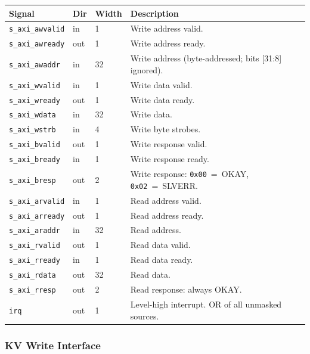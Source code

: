 \documentclass[10pt, a4paper]{article}
\newcommand{\hex}[1]{\texttt{0x#1}}
\newcommand{\portname}[1]{\texttt{#1}}
\begin{document}
\begin{tabularx}{\linewidth}{L{3.6cm} C{1.2cm} C{1.4cm} X}
\toprule
\textbf{Signal} & \textbf{Dir} & \textbf{Width} & \textbf{Description} \\
\midrule
{}
\portname{s\_axi\_awvalid} & in  & 1  & Write address valid. \\
\portname{s\_axi\_awready} & out & 1  & Write address ready. \\
\portname{s\_axi\_awaddr}  & in  & 32 & Write address (byte-addressed; bits [31:8] ignored). \\
\portname{s\_axi\_wvalid}  & in  & 1  & Write data valid. \\
\portname{s\_axi\_wready}  & out & 1  & Write data ready. \\
\portname{s\_axi\_wdata}   & in  & 32 & Write data. \\
\portname{s\_axi\_wstrb}   & in  & 4  & Write byte strobes. \\
\portname{s\_axi\_bvalid}  & out & 1  & Write response valid. \\
\portname{s\_axi\_bready}  & in  & 1  & Write response ready. \\
\portname{s\_axi\_bresp}   & out & 2  & Write response: \hex{00}~=~OKAY, \hex{02}~=~SLVERR. \\
\portname{s\_axi\_arvalid} & in  & 1  & Read address valid. \\
\portname{s\_axi\_arready} & out & 1  & Read address ready. \\
\portname{s\_axi\_araddr}  & in  & 32 & Read address. \\
\portname{s\_axi\_rvalid}  & out & 1  & Read data valid. \\
\portname{s\_axi\_rready}  & in  & 1  & Read data ready. \\
\portname{s\_axi\_rdata}   & out & 32 & Read data. \\
\portname{s\_axi\_rresp}   & out & 2  & Read response: always OKAY. \\
\portname{irq}             & out & 1  & Level-high interrupt. OR of all unmasked sources. \\
\bottomrule
\end{tabularx}

\subsubsection*{KV Write Interface}
\end{document}
